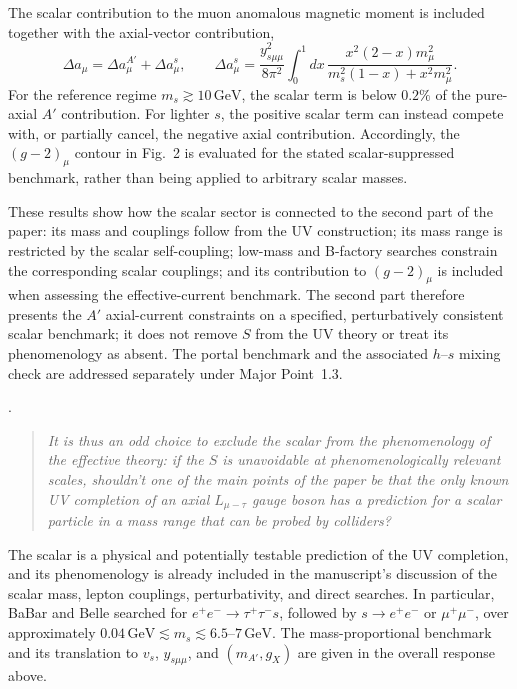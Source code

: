\documentclass[12pt,a4paper]{article}
\begin{document}
The scalar contribution to the muon anomalous magnetic moment is included together with the axial-vector contribution,
\[
\Delta a_\mu=\Delta a_\mu^{A'}+\Delta a_\mu^s,
\qquad
\Delta a_\mu^s=
\frac{y_{s\mu\mu}^2}{8\pi^2}
\int_0^1 dx\,
\frac{x^2(2-x)m_\mu^2}
{m_s^2(1-x)+x^2m_\mu^2}.
\]
For the reference regime \(m_s\gtrsim10\,\mathrm{GeV}\), the scalar term is below \(0.2\%\) of the pure-axial \(A'\) contribution. For lighter \(s\), the positive scalar term can instead compete with, or partially cancel, the negative axial contribution. Accordingly, the \((g-2)_\mu\) contour in Fig.~2 is evaluated for the stated scalar-suppressed benchmark, rather than being applied to arbitrary scalar masses.

These results show how the scalar sector is connected to the second part of the paper: its mass and couplings follow from the UV construction; its mass range is restricted by the scalar self-coupling; low-mass and B-factory searches constrain the corresponding scalar couplings; and its contribution to \((g-2)_\mu\) is included when assessing the effective-current benchmark. The second part therefore presents the \(A'\) axial-current constraints on a specified, perturbatively consistent scalar benchmark; it does not remove \(S\) from the UV theory or treat its phenomenology as absent. The portal benchmark and the associated \(h\)--\(s\) mixing check are addressed separately under Major Point~1.3.


\medskip
{}
. \begin{quote}\itshape
It is thus an odd choice to exclude the scalar from the phenomenology of the effective theory: if the \(S\) is unavoidable at phenomenologically relevant scales, shouldn't one of the main points of the paper be that the only known UV completion of an axial \(L_{\mu-\tau}\) gauge boson has a prediction for a scalar particle in a mass range that can be probed by colliders?\end{quote}

The scalar is a physical and potentially testable prediction of the UV completion, and its phenomenology is already included in the manuscript's discussion of the scalar mass, lepton couplings, perturbativity, and direct searches. In particular, BaBar and Belle searched for \(e^+e^-\to\tau^+\tau^-s\), followed by \(s\to e^+e^-\) or \(\mu^+\mu^-\), over approximately \(0.04\,\mathrm{GeV}\lesssim m_s\lesssim6.5\text{--}7\,\mathrm{GeV}\). The mass-proportional benchmark and its translation to \(v_s\), \(y_{s\mu\mu}\), and \((m_{A'},g_X)\) are given in the overall response above.
\end{document}
